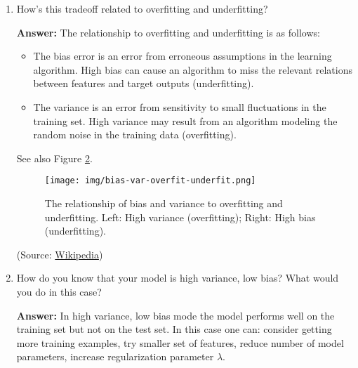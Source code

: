 \documentclass{article}
\newenvironment{QandA}{\begin{enumerate}[label=\arabic*.]}{\end{enumerate}}
\newenvironment{InnerQandA}{\begin{enumerate}[label=\roman*.]}{\end{enumerate}}
\newenvironment{answer}{\par\normalfont \textbf{Answer:}}{}
\begin{document}
\begin{QandA}
\begin{InnerQandA}
\begin{answer}
            (Source: \href{https://en.wikipedia.org/wiki/Bias\%E2\%80\%93variance\_tradeoff}{Wikipedia})

            \begin{figure}[htb!]
                \centering
                \texttt{[image: img/bias-var-complexity.png]}
                \caption{Bias-Variance tradeoff\footnotemark.}
                \label{fig:bias-variance-complexity}
            \end{figure}
            
        \end{answer}

        \item How’s this tradeoff related to overfitting and underfitting?
        \begin{answer}
            The relationship to overfitting and underfitting is as follows:
            \begin{itemize}
                \item The bias error is an error from erroneous assumptions in the learning algorithm. High bias can cause an algorithm to miss the relevant relations between features and target outputs (underfitting).
                \item The variance is an error from sensitivity to small fluctuations in the training set. High variance may result from an algorithm modeling the random noise in the training data (overfitting).
            \end{itemize}
            See also Figure \ref{fig:bias-variance-overfitting-underfitting}.

            \begin{figure}[htb!]
                \centering
                \texttt{[image: img/bias-var-overfit-underfit.png]}
                \caption{The relationship of bias and variance to overfitting and underfitting. Left: High variance (overfitting); Right: High bias (underfitting).}
                \label{fig:bias-variance-overfitting-underfitting}
            \end{figure}

            (Source: \href{https://en.wikipedia.org/wiki/Bias%E2%80%93variance_tradeoff}{Wikipedia})
        \end{answer}

        \item How do you know that your model is high variance, low bias? What would you do in this case?
        \begin{answer}
            In high variance, low bias mode the model performs well on the training set but not on the test set. In this case one can: consider getting more training examples, try smaller set of features, reduce number of model parameters, increase regularization parameter $\lambda$.
        \end{answer}


\end{InnerQandA}
\end{QandA}
\end{document}
